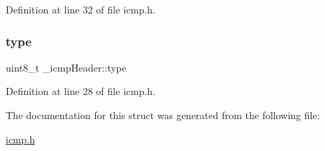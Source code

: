 Definition at line 32 of file icmp.\+h.

\mbox{\label{struct__icmpHeader_ac5cb21998813ca6fba404cd504fbada0}} 
\subsubsection{\texorpdfstring{type}{type}}
{\footnotesize\ttfamily uint8\+\_\+t \+\_\+icmp\+Header\+::type}



Definition at line 28 of file icmp.\+h.



The documentation for this struct was generated from the following file\+:\begin{DoxyCompactItemize}
\item 
\hyperlink{icmp_8h}{icmp.\+h}\end{DoxyCompactItemize}
